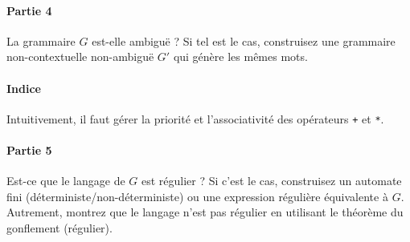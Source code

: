 \documentclass[12pt,french,a4paper]{article}
\begin{document}
\begin{question}
\paragraph{Partie 4}

La grammaire $G$ est-elle ambiguë ? Si tel est le cas, construisez une grammaire non-contextuelle non-ambiguë $G'$ qui génère les mêmes mots.

\paragraph{Indice} Intuitivement, il faut gérer la priorité et l'associativité des opérateurs \texttt{+} et \texttt{*}. 

\paragraph{Partie 5}

Est-ce que le langage de $G$ est régulier ? Si c'est le cas, construisez un automate fini (déterministe/non-déterministe) ou une expression régulière équivalente à $G$. Autrement, montrez que le langage n'est pas régulier en utilisant le théorème du gonflement (régulier).

\end{question}

\vspace{2cm}
\end{document}
